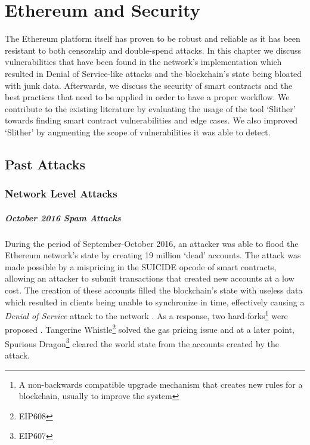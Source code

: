 \chapter{Ethereum and Security} \label{ch:security}

The Ethereum platform itself has proven to be robust and reliable as it has been resistant to both censorship and double-spend attacks. In this chapter we discuss vulnerabilities that have been found in the network's implementation which resulted in Denial of Service-like attacks and the blockchain's state being bloated with junk data. Afterwards, we discuss the security of smart contracts and the best practices that need to be applied in order to have a proper workflow. We contribute to the existing literature by evaluating the usage of the tool `Slither' towards finding smart contract vulnerabilities and edge cases. We also improved `Slither' by augmenting the scope of vulnerabilities it was able to detect.
\section{Past Attacks}
\subsection{Network Level Attacks}

\paragraph{October 2016 Spam Attacks}
During the period of September-October 2016, an attacker was able to flood the Ethereum network's state by creating 19 million `dead' accounts. The attack was made possible by a mispricing in the SUICIDE opcode of smart contracts, allowing an attacker to submit transactions that created new accounts at a low cost. The creation of these accounts filled the blockchain's state with useless data which resulted in clients being unable to synchronize in time, effectively causing a \textit{Denial of Service} attack to the network \cite{eip150faq}. As a response, two hard-forks\footnote{A non-backwards compatible upgrade mechanism that creates new rules for a blockchain, usually to improve the system} were proposed \cite{eip607, eip608}. Tangerine Whistle\footnote{EIP608} solved the gas pricing issue and at a later point, Spurious Dragon\footnote{EIP607} cleared the world state from the accounts created by the attack. 

